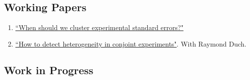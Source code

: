 \documentclass[11pt, a4paper]{article}
\begin{document}
\subsection*{Working Papers}

\begin{enumerate}


\item \href{https://ts-robinson.com/publication/robinson-whenshouldwe-2020/robinson-whenshouldwe-2020.pdf}{``When should we cluster experimental standard errors?" }

\item \href{https://ts-robinson.com/publication/robinson-conjoint-2021/robinson-conjoint-2021.pdf}{``How to detect heterogeneity in conjoint experiments"}.  With Raymond Duch.

\end{enumerate}

\subsection*{Work in Progress}
\end{document}
